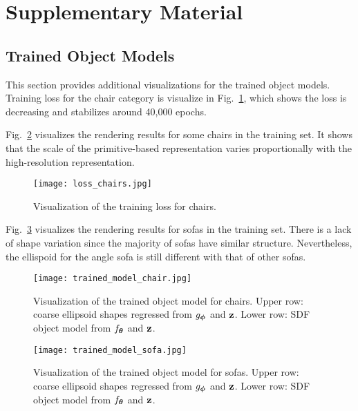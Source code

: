 \section*{Supplementary Material}

\subsection*{Trained Object Models}

This section provides additional visualizations for the trained object models. Training loss for the chair category is visualize in Fig.~\ref{fig:training_loss_chair}, which shows the loss is decreasing and stabilizes around 40,000 epochs. 

Fig.~\ref{fig:trained_model_chair} visualizes the rendering results for some chairs in the training set. It shows that the scale of the primitive-based representation varies proportionally with the high-resolution representation. 

\begin{figure}[thp!]
    \centering
    \texttt{[image: loss\_chairs.jpg]}
    \caption{Visualization of the training loss for chairs.}
    \label{fig:training_loss_chair}
\end{figure}


Fig.~\ref{fig:trained_model_sofa} visualizes the rendering results for sofas in the training set. There is a lack of shape variation since the majority of sofas have similar structure. Nevertheless, the ellispoid for the angle sofa is still different with that of other sofas. 

\begin{figure}[thp!]
    \centering
    \texttt{[image: trained\_model\_chair.jpg]}
    \caption{Visualization of the trained object model for chairs. Upper row: coarse ellipsoid shapes regressed from $g_{\boldsymbol{\phi}}$ and $\mathbf{z}$. Lower row: SDF object model from $f_{\boldsymbol{\theta}}$ and $\mathbf{z}$.}
    \label{fig:trained_model_chair}
\end{figure}





\begin{figure}[thp!]
    \centering
    \texttt{[image: trained\_model\_sofa.jpg]}
    \caption{Visualization of the trained object model for sofas. Upper row: coarse ellipsoid shapes regressed from $g_{\boldsymbol{\phi}}$ and $\mathbf{z}$. Lower row: SDF object model from $f_{\boldsymbol{\theta}}$ and $\mathbf{z}$.}
    \label{fig:trained_model_sofa}
\end{figure}



